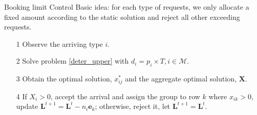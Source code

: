       \begin{frame}{Booking limit Control}
        Basic idea: for each type of requests, we only allocate a fixed amount according to the static solution and reject all other exceeding requests.
        \begin{itemize}
          \item[1] Observe the arriving type $i$.
          \item[2] Solve problem \eqref{deter_upper} with $d_{i} = p_{i} \times T, i \in \mathcal{M}$.
          \item[3] Obtain the optimal solution, $x_{ij}^{*}$ and the aggregate optimal solution, $\mathbf{X}$.
          \item[4] If $X_{i} > 0$, accept the arrival and assign the group to row $k$ where $x_{ik} > 0$, update $\mathbf{L}^{t+1} = \mathbf{L}^{t} - n_i \mathbf{e}_{k}$; otherwise, reject it, let $\mathbf{L}^{t+1} = \mathbf{L}^{t}$.
        \end{itemize}
                 
      \end{frame}
      